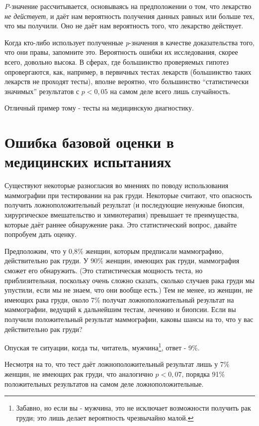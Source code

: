 \emph{P}-значение рассчитывается, основываясь на предположении о том, что лекарство \emph{не действует}, и даёт нам вероятность получения данных равных или больше тех, что мы получили. Оно не даёт нам вероятность того, что лекарство действует.

Когда кто-либо использует полученные \emph{p}-значения в качестве доказательства того, что они правы, запомните это. Вероятность ошибки их исследования, скорее всего, довольно высока. В сферах, где большинство проверяемых гипотез опровергаются, как, например, в первичных тестах лекарств (большинство таких лекарств не проходят тесты), вполне вероятно, что большинство ``статистически значимых'' результатов с $p < 0,05$ на самом деле всего лишь случайность.

Отличный пример тому - тесты на медицинскую диагностику.


\section[В медицинских испытаниях]{Ошибка базовой оценки в медицинских испытаниях}
\label{chp5:base-rateF}

Существуют некоторые разногласия во мнениях по поводу использования маммографии при тестировании на рак груди. Некоторые считают, что опасность получить ложноположительный результат (и последующие ненужные биопсия, хирургическое вмешательство и химиотерапия) превышает те преимущества, которые даёт раннее обнаружение рака. Это статистический вопрос, давайте попробуем дать оценку.

Предположим, что у 0,8\% женщин, которым предписали маммографию, действительно  рак груди. У 90\% женщин, имеющих рак груди, маммография сможет его обнаружить. (Это статистическая мощность теста, но приблизительная, поскольку очень сложно сказать, сколько случаев рака груди мы упустили, если мы не знаем, что они вообще есть.) Тем не менее, из женщин, не имеющих рака груди, около 7\% получат ложноположительный результат на маммографии, ведущий к дальнейшим тестам, лечению и биопсии. Если вы получили положительный результат маммографии, каковы шансы на то, что у вас действительно рак груди?

Опуская те ситуации, когда ты, читатель, мужчина\footnote{Забавно, но если вы - мужчина, это не исключает возможности получить рак груди; это лишь делает вероятность чрезвычайно малой.}, ответ - 9\%.\cite{kramer_how_2005}

Несмотря на то, что тест даёт ложноположительный результат лишь у 7\% женщин, не имеющих рак груди, что аналогично $p < 0,07$, порядка 91\% положительных результатов на самом деле ложноположительные.

